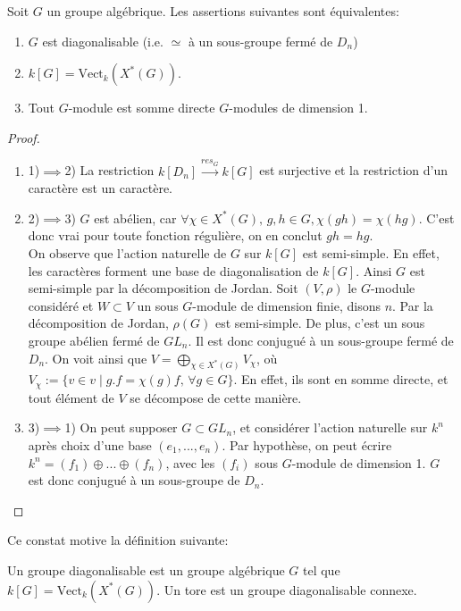 \begin{prop}
Soit $G$ un groupe algébrique. Les assertions suivantes sont équivalentes:
\begin{enumerate}
\item $G$ est diagonalisable (i.e. $\simeq$ à un sous-groupe fermé de $D_n$)
\item $k[G]=\textrm{Vect}_k(X^*(G))$.
\item Tout $G$-module est somme directe $G$-modules de dimension 1.
\end{enumerate}
\end{prop}
\begin{proof}
\begin{enumerate}
\item 1)$\implies$2) La restriction $k[D_n]\xrightarrow{res_G} k[G]$ est surjective et la restriction d'un caractère est un caractère.
\item 2)$\implies$3) $G$ est abélien, car $\forall \chi\in X^*(G),\,g,h\in G, \chi(gh)=\chi(hg)$. C'est donc vrai pour toute fonction régulière, on en conclut $gh=hg$.\\
On observe que l'action naturelle de $G$ sur $k[G]$ est semi-simple. En effet, les caractères forment une base de diagonalisation de $k[G]$. Ainsi $G$ est semi-simple par la décomposition de Jordan. Soit $(V,\rho)$ le $G$-module considéré et $W\subset V$ un sous $G$-module de dimension finie, disons $n$. Par la décomposition de Jordan,  $\rho(G)$ est semi-simple. De plus, c'est un sous groupe abélien fermé de $GL_n$. Il est donc conjugué à un sous-groupe fermé de $D_n$. On voit ainsi que $V=\bigoplus_{\chi \in X^*(G)}V_\chi$, où $V_\chi:=\lbrace v\in v\mid g.f=\chi(g)f,\, \forall g\in G \rbrace$. En effet, ils sont en somme directe, et tout élément de $V$ se décompose de cette manière.
\item 3)$\implies$1) On peut supposer $G\subset GL_n$, et considérer l'action naturelle sur $k^n$ après choix d'une base $(e_1,...,e_n)$. Par hypothèse, on peut écrire $k^n=(f_1)\oplus...\oplus (f_n)$, avec les $(f_i)$ sous $G$-module de dimension 1. $G$ est donc conjugué à un sous-groupe de $D_n$.
\end{enumerate}
\end{proof}

Ce constat motive la définition suivante:

\begin{defn}
Un groupe diagonalisable est un groupe algébrique $G$ tel que $k[G]=\textrm{Vect}_k(X^*(G))$. Un tore est un groupe diagonalisable connexe.
\end{defn}

